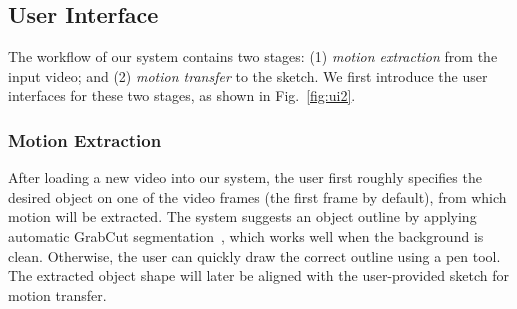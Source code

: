 
\subsection{User Interface} \label{sec:ui}
The workflow of our system contains two stages: (1) {\em motion extraction} from the input video; and (2) {\em motion transfer} to the sketch. We first introduce the user interfaces for these two stages, as shown in Fig.~\ref{fig:ui2}.

\subsubsection{Motion Extraction}\label{sec:motion_extraction}

After loading a new video into our system, 
the user first roughly specifies the desired object on {one of the video frames (the first frame by default)}, from which motion will be extracted.
The system suggests an object outline by applying automatic GrabCut segmentation~\cite{Rother:2004}, which works well when the background is clean. Otherwise, the user can quickly draw the correct outline using a pen tool. The extracted object shape will later be aligned with the user-provided sketch for motion transfer.

